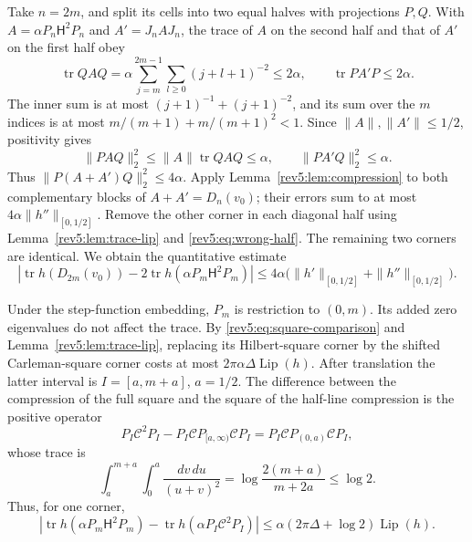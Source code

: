 Take $n=2m$, and split its cells into two equal halves with projections
$P,Q$.  With $A=\alpha P_n\mathsf H^2P_n$ and
$A'=J_nAJ_n$, the trace of $A$ on the second half and that of $A'$ on the
first half obey
\begin{equation}\label{rev5:eq:wrong-half}
 \operatorname{tr}QAQ
 =\alpha\sum_{j=m}^{2m-1}\sum_{l\geq0}(j+l+1)^{-2}\leq2\alpha,
 \qquad \operatorname{tr}PA'P\leq2\alpha.
\end{equation}
The inner sum is at most $(j+1)^{-1}+(j+1)^{-2}$, and its sum
over the $m$ indices is at most $m/(m+1)+m/(m+1)^2<1$.
Since $\|A\|,\|A'\|\le1/2$, positivity gives
\[
 \|PAQ\|_2^2\leq\|A\|\operatorname{tr}QAQ\leq\alpha,
 \qquad \|PA'Q\|_2^2\leq\alpha.
\]
Thus $\|P(A+A')Q\|_2^2\leq4\alpha$.
Apply Lemma~\ref{rev5:lem:compression} to both complementary blocks
of $A+A'=D_n(v_0)$; their errors sum to at most
$4\alpha\|h''\|_{[0,1/2]}$.  Remove the other corner in each diagonal
half using Lemma~\ref{rev5:lem:trace-lip} and
\eqref{rev5:eq:wrong-half}.  The remaining two corners are identical.
We obtain the quantitative estimate
\begin{equation}\label{rev5:eq:decouple}
 \left|\operatorname{tr}h(D_{2m}(v_0))
       -2\operatorname{tr}h(\alpha P_m\mathsf H^2P_m)\right|
 \leq4\alpha\bigl(\|h'\|_{[0,1/2]}+\|h''\|_{[0,1/2]}\bigr).
\end{equation}

Under the step-function embedding, $P_m$ is restriction to $(0,m)$.
Its added zero eigenvalues do not affect the trace.  By
\eqref{rev5:eq:square-comparison} and Lemma~\ref{rev5:lem:trace-lip},
replacing its Hilbert-square corner by the shifted Carleman-square
corner costs at most $2\pi\alpha\Delta\operatorname{Lip}(h)$.
After translation the latter interval is $I=[a,m+a]$, $a=1/2$.
The difference between the compression of the full square and the
square of the half-line compression is the positive operator
\[
 P_I\mathcal C^2P_I
 -P_I\mathcal C P_{[a,\infty)}\mathcal C P_I
 =P_I\mathcal C P_{(0,a)}\mathcal C P_I,
\]
whose trace is
\begin{equation}\label{rev5:eq:missing-interval}
 \int_a^{m+a}\int_0^a\frac{dv\,du}{(u+v)^2}
 =\log\frac{2(m+a)}{m+2a}\leq\log2.
\end{equation}
Thus, for one corner,
\begin{equation}\label{rev5:eq:corner-transfer}
 \left|\operatorname{tr}h(\alpha P_m\mathsf H^2P_m)
       -\operatorname{tr}h(\alpha P_I\mathcal C^2P_I)\right|
 \leq\alpha(2\pi\Delta+\log2)\operatorname{Lip}(h).
\end{equation}

